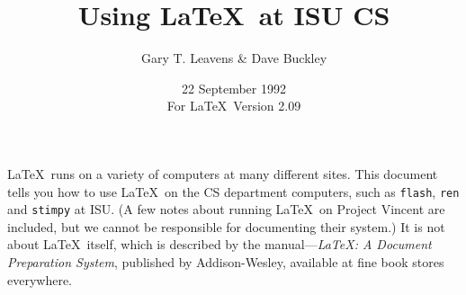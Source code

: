 %
%



\newcommand{\contact}{the Systems Support Group}

\newcommand{\BibTeX}{{\rm B\kern-.05em{\sc i\kern-.025em b}\kern-.08em
    T\kern-.1667em\lower.7ex\hbox{E}\kern-.125emX}}

\newcommand{\SLiTeX}{{\rm S\kern-.06em{\sc l\kern-.035emi}\kern-.06em T\kern
   -.1667em\lower.7ex\hbox{E}\kern-.125emX}}


\newcommand\bs{\char '134 }   %
\newcommand{\lb}{\char '173 } %
\newcommand{\rb}{\char '175 } %

\title{Using \LaTeX\ at ISU CS}

\author{Gary T. Leavens \& Dave Buckley}

\date{22 September 1992\\              %
For \LaTeX\ Version 2.09} 



\maketitle

\tableofcontents

\newpage

\LaTeX\ runs on a variety of computers at many different sites.  This
document tells you how to use \LaTeX\ on the CS department
computers, such as {\tt flash}, {\tt ren} and {\tt stimpy} at ISU.
(A few notes about running \LaTeX\ on Project Vincent are included,
but we cannot be responsible for documenting their system.)
It is not about \LaTeX\ itself, which is described by
the manual---{\em \LaTeX: A Document Preparation System}, published by
Addison-Wesley, available at fine book stores everywhere.

